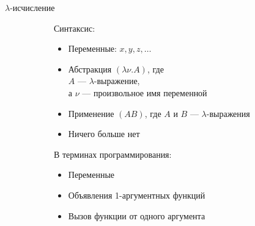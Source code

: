 \begin{frame}{$\lambda$-исчисление}
\begin{figure}[t]
  \begin{subfigure}[t]{0.35\textwidth}
    \vspace{-5em}
    \vspace{-1em}
    Синтаксис:
    \begin{itemize}
      \item Переменные: $x,y,z,\dots$
      \item Абстракция $(\lambda \nu. A)$, где \\
      $A$ --- $\lambda$-выражение, \\
      а $\nu$ --- произвольное имя переменной
      \item Применение $(AB)$, где $A$ и $B$ --- $\lambda$-выражения
      \item Ничего больше нет
    \end{itemize}
  \end{subfigure}
\hspace{1cm}
  \begin{subfigure}[t]{0.55\textwidth}

      \vspace{-5.5em}
В терминах программирования:
\begin{itemize}
  \item Переменные
  \item Объявления 1-аргументных функций
  \item Вызов функции от одного аргумента
\end{itemize}
\end{subfigure}
\end{figure}
\end{frame}

